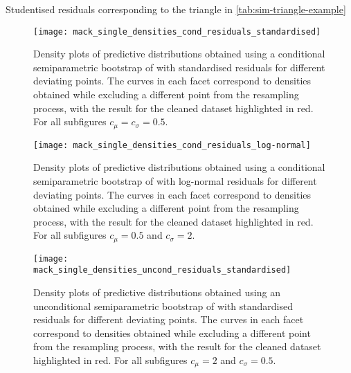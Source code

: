 \documentclass[a4paper]{book}
\begin{document}
\begin{table}[!htb]
  
  \caption{Studentised residuals corresponding to the triangle in \cref{tab:sim-triangle-example}}
  \label{tab:resids-studentised-example}
\end{table}


\begin{landscape}
  \begin{figure}
    \centering
    \texttt{[image: mack\_single\_densities\_cond\_residuals\_standardised]}
    \caption[Single outlier density plots for Mack's model, conditional semiparametric bootstrap with standardised residuals]{Density plots of predictive distributions obtained using a conditional semiparametric bootstrap of  with standardised residuals for different deviating points. The curves in each facet correspond to densities obtained while excluding a different point from the resampling process, with the result for the cleaned dataset highlighted in red. For all subfigures $c_\mu = c_\sigma = 0.5$.}
    \label{fig:mack-single-cond-semiparam-standardised}
  \end{figure}
\end{landscape}

\begin{landscape}
  \begin{figure}
    \centering
    \texttt{[image: mack\_single\_densities\_cond\_residuals\_log-normal]}
    \caption[Single outlier density plots for Mack's model, conditional semiparametric bootstrap with log-normal residuals]{Density plots of predictive distributions obtained using a conditional semiparametric bootstrap of  with log-normal residuals for different deviating points. The curves in each facet correspond to densities obtained while excluding a different point from the resampling process, with the result for the cleaned dataset highlighted in red. For all subfigures $c_\mu = 0.5$ and $c_\sigma = 2$.}
    \label{fig:mack-single-cond-semiparam-log-normal}
  \end{figure}
\end{landscape}

\begin{landscape}
  \begin{figure}
    \centering
    \texttt{[image: mack\_single\_densities\_uncond\_residuals\_standardised]}
    \caption[Single outlier density plots for Mack's model, unconditional semiparametric bootstrap with standardised residuals]{Density plots of predictive distributions obtained using an unconditional semiparametric bootstrap of  with standardised residuals for different deviating points. The curves in each facet correspond to densities obtained while excluding a different point from the resampling process, with the result for the cleaned dataset highlighted in red. For all subfigures $c_\mu = 2$ and $c_\sigma = 0.5$.}
    \label{fig:mack-single-uncond-semiparam-standardised}
  \end{figure}
\end{landscape}
\end{document}
